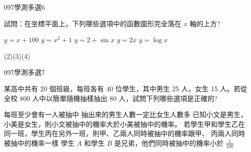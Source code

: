 \begin{QUESTIONS}
    \begin{QUESTION}
        \begin{ExamInfo}{097}{學測}{多選}{6}
        \end{ExamInfo}
        \begin{ExamAnsRateInfo}{56}{92}{58}{18}
        \end{ExamAnsRateInfo}
        \begin{QBODY}
			試問：在坐標平面上，下列哪些選項中的函數圖形完全落在 $x$ 軸的上方? 
			\begin{QOPS} 
				\QOP $y=x+100$
				\QOP $y=x^2+1$ 
				\QOP $y=2+\sin x$
				\QOP $y=2x$
				\QOP $y=\log x$
			\end{QOPS}
        \end{QBODY}
        \begin{QFROMS}
        \end{QFROMS}
        \begin{QTAGS}\end{QTAGS}
        \begin{QANS}
            (2)(3)(4)
        \end{QANS}
        \begin{QSOLLIST}
        \end{QSOLLIST}
        \begin{QEMPTYSPACE}
        \end{QEMPTYSPACE}
    \end{QUESTION}
    \begin{QUESTION}
        \begin{ExamInfo}{097}{學測}{多選}{7}
        \end{ExamInfo}
        \begin{ExamAnsRateInfo}{39}{60}{40}{17}
        \end{ExamAnsRateInfo}
        \begin{QBODY}
			某高中共有 20 個班級，每班各有 40 位學生，其中男生 25 人，女生 15 人。若從全校 800 人中以簡單隨機抽樣抽出 80 人，試問下列哪些選項是正確的? 
			\begin{QOPS} 
				\QOP 每班至少會有一人被抽中 
				\QOP 抽出來的男生人數一定比女生人數多 
				\QOP 已知小文是男生，小美是女生，則小文被抽中的機率大於小美被抽中的機率。 
				\QOP 若學生甲和學生乙在同一班，學生丙在另外一班，則甲、乙兩人同時被抽中的機率跟甲、 丙兩人同時被抽中的機率一樣 
				\QOP 學生 $A$ 和學生 $B$ 是兄弟，他們同時被抽中的機率小於 $\frac{1}{100}$
            \end{QOPS}
        \end{QBODY}

\end{QUESTION}
\end{QUESTIONS}
